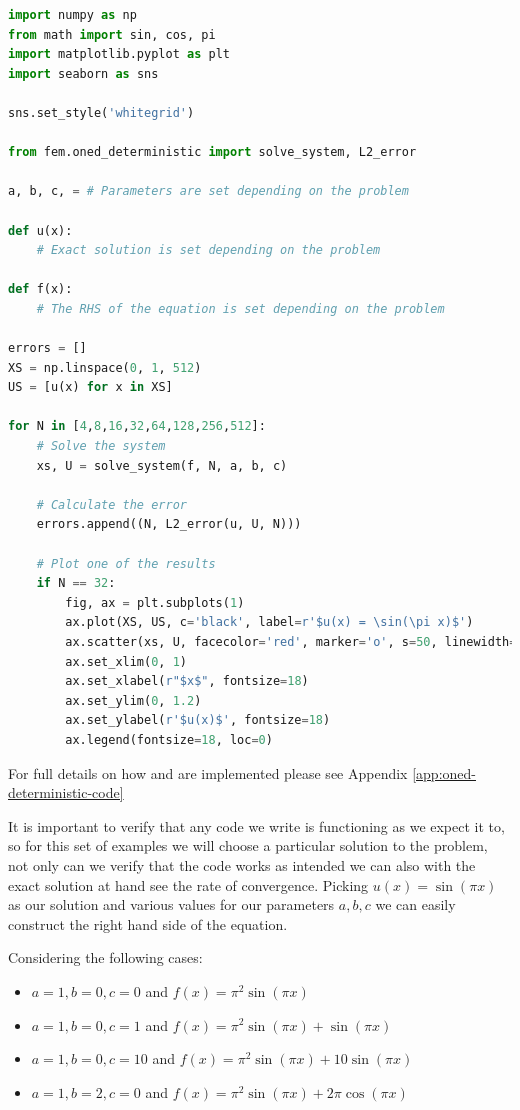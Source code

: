 \begin{lstlisting}[caption={Setup code for the Finite Element Method
                            Implementation},
                   label={code:oned-deterministic},
                   language=Python]
import numpy as np
from math import sin, cos, pi
import matplotlib.pyplot as plt
import seaborn as sns

sns.set_style('whitegrid')

from fem.oned_deterministic import solve_system, L2_error

a, b, c, = # Parameters are set depending on the problem

def u(x):
    # Exact solution is set depending on the problem

def f(x):
    # The RHS of the equation is set depending on the problem

errors = []
XS = np.linspace(0, 1, 512)
US = [u(x) for x in XS]

for N in [4,8,16,32,64,128,256,512]:
    # Solve the system
    xs, U = solve_system(f, N, a, b, c)

    # Calculate the error
    errors.append((N, L2_error(u, U, N)))

    # Plot one of the results
    if N == 32:
        fig, ax = plt.subplots(1)
        ax.plot(XS, US, c='black', label=r'$u(x) = \sin(\pi x)$')
        ax.scatter(xs, U, facecolor='red', marker='o', s=50, linewidth=0, label=r'$u^h(x)$', alpha=1)
        ax.set_xlim(0, 1)
        ax.set_xlabel(r"$x$", fontsize=18)
        ax.set_ylim(0, 1.2)
        ax.set_ylabel(r'$u(x)$', fontsize=18)
        ax.legend(fontsize=18, loc=0)
\end{lstlisting}

For full details on how  and  are
implemented please see Appendix \ref{app:oned-deterministic-code}

It is important to verify that any code we write is functioning as we expect it
to, so for this set of examples we will choose a particular solution to the
problem, not only can we verify that the code works as intended we can also
with the exact solution at hand see the rate of convergence.  Picking $u(x) =
\sin{(\pi x)}$ as our solution and various values for our parameters $a,b,c$ we
can easily construct the right hand side of the equation.

Considering the following cases:
\begin{itemize}
    \item $a = 1, b = 0, c = 0$ and
          $f(x) = \pi^2\sin{(\pi x)}$
    \item $a = 1, b = 0, c = 1$ and
          $f(x) = \pi^2\sin{(\pi x)} + \sin{(\pi x)}$
    \item $a = 1, b = 0, c = 10$ and
          $f(x) = \pi^2\sin{(\pi x)} + 10\sin{(\pi x)}$
    \item $a = 1, b = 2, c = 0$ and
          $f(x) = \pi^2\sin{(\pi x)} + 2\pi\cos{(\pi x)}$
\end{itemize}

